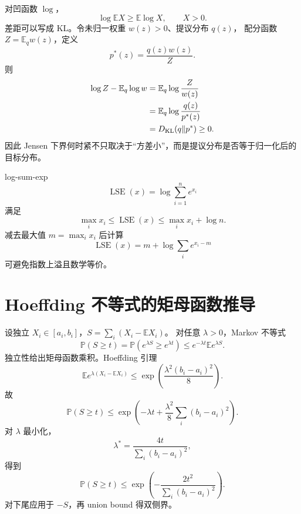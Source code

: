 \documentclass[11pt]{article}
\numberwithin{equation}{section}
\newcommand{\E}{\mathbb{E}}
\newcommand{\Pp}{\mathbb{P}}
\newcommand{\1}{\mathbf{1}}
\begin{document}
对凹函数 $\log$，
\begin{equation}
 \log\E X\ge\E\log X,
 \qquad X>0.
\end{equation}
差距可以写成 KL。令未归一权重 $w(z)>0$、提议分布 $q(z)$，
配分函数 $Z=\E_qw(z)$，定义
\begin{equation}
 p^*(z)=\frac{q(z)w(z)}{Z}.
\end{equation}
则
\begin{align}
 \log Z-\E_q\log w
 &=\E_q\log\frac{Z}{w(z)}\\
 &=\E_q\log\frac{q(z)}{p^*(z)}\\
 &=D_{\rm KL}(q\|p^*)\ge0.
\end{align}
因此 Jensen 下界何时紧不只取决于“方差小”，而是提议分布是否等于归一化后的目标分布。

log-sum-exp
\begin{equation}
 \operatorname{LSE}(x)=\log\sum_{i=1}^{n}e^{x_i}
\end{equation}
满足
\begin{equation}
 \max_i x_i\le\operatorname{LSE}(x)
 \le\max_i x_i+\log n.
\end{equation}
减去最大值 $m=\max_ix_i$ 后计算
\begin{equation}
 \operatorname{LSE}(x)=m+\log\sum_ie^{x_i-m}
\end{equation}
可避免指数上溢且数学等价。

\section{Hoeffding 不等式的矩母函数推导}

设独立 $X_i\in[a_i,b_i]$，$S=\sum_i(X_i-\E X_i)$。
对任意 $\lambda>0$，Markov 不等式
\begin{equation}
 \Pp(S\ge t)=\Pp(e^{\lambda S}\ge e^{\lambda t})
 \le e^{-\lambda t}\E e^{\lambda S}.
\end{equation}
独立性给出矩母函数乘积。Hoeffding 引理
\begin{equation}
 \E e^{\lambda(X_i-\E X_i)}
 \le\exp\left(\frac{\lambda^2(b_i-a_i)^2}{8}\right).
\end{equation}
故
\begin{equation}
 \Pp(S\ge t)
 \le\exp\left(-\lambda t+\frac{\lambda^2}{8}
 \sum_i(b_i-a_i)^2\right).
\end{equation}
对 $\lambda$ 最小化，
\begin{equation}
 \lambda^*=\frac{4t}{\sum_i(b_i-a_i)^2},
\end{equation}
得到
\begin{equation}
 \Pp(S\ge t)
 \le\exp\left(-\frac{2t^2}{\sum_i(b_i-a_i)^2}\right).
\end{equation}
对下尾应用于 $-S$，再 union bound 得双侧界。
\end{document}
